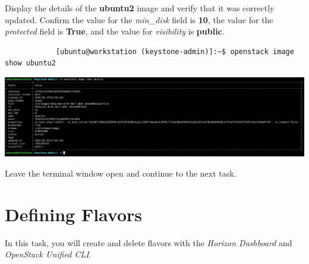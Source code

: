 \documentclass[letterpaper, 12pt]{article}
\begin{document}
\begin{enumerate}
    \begin{labstep}
        Display the details of the \textbf{ubuntu2} image and verify that it was correctly updated.
        Confirm the value for the \textit{min\_disk} field is \textbf{10}, the value for the \textit{protected} field is \textbf{True}, and the value for \textit{visibility} is \textbf{public}.
        \begin{lstlisting}
            [ubuntu@workstation (keystone-admin)]:~$ openstack image show ubuntu2
        \end{lstlisting}

        \begin{center}
            \includegraphics[width=\linewidth]{images/part1/step23.png}
        \end{center}
    \end{labstep}

    \begin{labstep}
        Leave the terminal window open and continue to the next task.
    \end{labstep}

\end{enumerate}

\section{Defining Flavors}\label{sec:defining-flavors}
In this task, you will create and delete flavors with the \textit{Horizon Dashboard} and \textit{OpenStack Unified CLI}.
\end{document}
